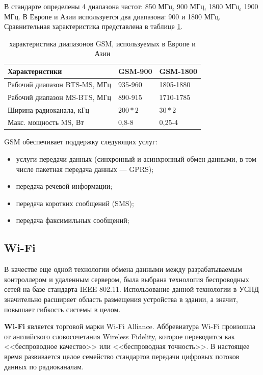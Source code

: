 \documentclass[utf8,14pt, coursreport]{G7-32}
\begin{document}
В стандарте определены 4 диапазона частот: 850 МГц, 900 МГц, 1800 МГц, 1900 МГц. В Европе и Азии используется два диапазона: 900 и 1800 МГц. Сравнительная характеристика представлена в таблице \ref{gsmtable}.

\begin{table}[h!]
\caption{характеристика диапазонов GSM, используемых в Европе и Азии\cite{gsmchar}}
\label{gsmtable}
	\begin{tabular}{|m{70mm}|m{40mm}|m{40mm}|}
	\hline
	Характеристики & GSM-900 & GSM-1800\\
	\hline
	Рабочий диапазон BTS-MS, МГц & 935-960 & 1805-1880\\
	\hline
	Рабочий диапазон MS-BTS, МГц & 890-915 & 1710-1785\\
	\hline
	Ширина радиоканала, кГц & $200*2$ & $30*2$\\
	\hline
	Макс. мощность MS, Вт & 0,8-8 & 0,25-4 \\
	\hline
	\end{tabular}
\end{table}

GSM обеспечивает поддержку следующих услуг:
\begin{itemize}
\item услуги передачи данных (синхронный и асинхронный обмен данными, в том числе пакетная передача данных — GPRS);
\item передача речевой информации;
\item передача коротких сообщений (SMS);
\item передача факсимильных сообщений;
\end{itemize}

\newpage

\subsection{Wi-Fi}

В качестве еще одной технологии обмена данными между разрабатываемым контроллером и удаленным сервером, была выбрана технология беспроводных сетей на базе стандарта IEEE 802.11. Использование данной технологии в УСПД значительно расширяет область размещения устройства в здании, а значит, повышает гибкость системы в целом.

\textbf{Wi-Fi} является торговой марки Wi-Fi Alliance. Аббревиатура Wi-Fi произошла от английского словосочетания Wireless Fidelity, которое переводится как <<беспроводное качество>> или <<беспроводная точность>>. В настоящее время развивается целое семейство стандартов передачи цифровых потоков данных по радиоканалам.
\end{document}
